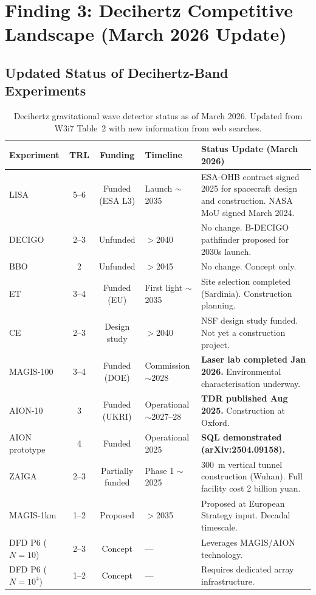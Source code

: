 \documentclass[11pt]{article}
\theoremstyle{definition}
\theoremstyle{remark}
\begin{document}
\section{Finding 3: Decihertz Competitive Landscape (March 2026 Update)}
\label{sec:landscape}

\subsection{Updated Status of Decihertz-Band Experiments}

\begin{table}[H]
\centering
\caption{Decihertz gravitational wave detector status as of March 2026.
Updated from W3i7 Table~2 with new information from web searches.}
\label{tab:landscape}
\small
\begin{tabular}{@{}p{2.5cm}ccp{2.5cm}p{4cm}@{}}
\toprule
Experiment & TRL & Funding & Timeline & Status Update (March 2026) \\
\midrule
LISA & 5--6 & Funded (ESA L3) & Launch $\sim$2035
  & ESA-OHB contract signed 2025 for spacecraft design and construction.
    NASA MoU signed March 2024. \\[4pt]
DECIGO & 2--3 & Unfunded & $>$2040
  & No change. B-DECIGO pathfinder proposed for 2030s launch. \\[4pt]
BBO & 2 & Unfunded & $>$2045
  & No change. Concept only. \\[4pt]
ET & 3--4 & Funded (EU) & First light $\sim$2035
  & Site selection completed (Sardinia). Construction planning. \\[4pt]
CE & 2--3 & Design study & $>$2040
  & NSF design study funded. Not yet a construction project. \\[4pt]
MAGIS-100 & 3--4 & Funded (DOE) & Commission $\sim$2028
  & \textbf{Laser lab completed Jan 2026.} Environmental
    characterisation underway. \\[4pt]
AION-10 & 3 & Funded (UKRI) & Operational $\sim$2027--28
  & \textbf{TDR published Aug 2025.} Construction at Oxford. \\[4pt]
AION prototype & 4 & Funded & Operational 2025
  & \textbf{SQL demonstrated (arXiv:2504.09158).} \\[4pt]
ZAIGA & 2--3 & Partially funded & Phase 1 $\sim$2025
  & 300~m vertical tunnel construction (Wuhan). Full facility
    cost 2 billion yuan. \\[4pt]
MAGIS-1km & 1--2 & Proposed & $>$2035
  & Proposed at European Strategy input. Decadal timescale. \\[4pt]
\midrule
DFD P6 ($N=10$) & 2--3 & Concept & ---
  & Leverages MAGIS/AION technology. \\[4pt]
DFD P6 ($N=10^4$) & 1--2 & Concept & ---
  & Requires dedicated array infrastructure. \\
\bottomrule
\end{tabular}
\end{table}
\end{document}
